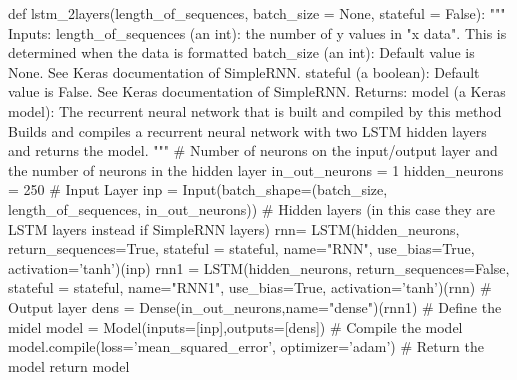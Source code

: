 \documentclass[%
oneside,                 %
final,                   %
10pt]{article}
\begin{document}
\bpycod
def lstm_2layers(length_of_sequences, batch_size = None, stateful = False):
    """
        Inputs:
            length_of_sequences (an int): the number of y values in "x data".  This is determined
                when the data is formatted
            batch_size (an int): Default value is None.  See Keras documentation of SimpleRNN.
            stateful (a boolean): Default value is False.  See Keras documentation of SimpleRNN.
        Returns:
            model (a Keras model): The recurrent neural network that is built and compiled by this
                method
        Builds and compiles a recurrent neural network with two LSTM hidden layers and returns the model.
    """
    # Number of neurons on the input/output layer and the number of neurons in the hidden layer
    in_out_neurons = 1
    hidden_neurons = 250
    # Input Layer
    inp = Input(batch_shape=(batch_size, 
                length_of_sequences, 
                in_out_neurons)) 
    # Hidden layers (in this case they are LSTM layers instead if SimpleRNN layers)
    rnn= LSTM(hidden_neurons, 
                    return_sequences=True,
                    stateful = stateful,
                    name="RNN", use_bias=True, activation='tanh')(inp)
    rnn1 = LSTM(hidden_neurons, 
                    return_sequences=False,
                    stateful = stateful,
                    name="RNN1", use_bias=True, activation='tanh')(rnn)
    # Output layer
    dens = Dense(in_out_neurons,name="dense")(rnn1)
    # Define the midel
    model = Model(inputs=[inp],outputs=[dens])
    # Compile the model
    model.compile(loss='mean_squared_error', optimizer='adam')  
    # Return the model
    return model
\end{document}
